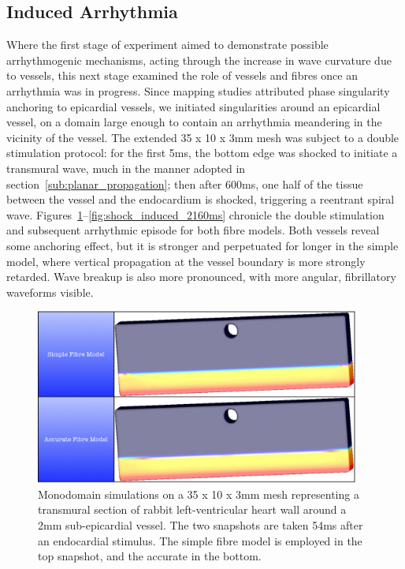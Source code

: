   \subsection{Induced Arrhythmia} %
  \label{sub:induced_arrhythmia}
    Where the first stage of experiment aimed to demonstrate possible arrhythmogenic mechanisms, acting through the increase in wave curvature due to vessels, this next stage examined the role of vessels and fibres once an arrhythmia was in progress. Since mapping studies \cite{Valderrabano2003,Cysyk2008,Qin2005} attributed phase singularity anchoring to epicardial vessels, we initiated singularities around an epicardial vessel, on a domain large enough to contain an arrhythmia meandering in the vicinity of the vessel. The extended 35 x 10 x 3mm mesh was subject to a double stimulation protocol: for the first 5ms, the bottom edge was shocked to initiate a transmural wave, much in the manner adopted in section~\ref{sub:planar_propagation}; then after 600ms, one half of the tissue between the vessel and the endocardium is shocked, triggering a reentrant spiral wave. Figures~\ref{fig:shock_induced_54ms}--\ref{fig:shock_induced_2160ms} chronicle the double stimulation and subsequent arrhythmic episode for both fibre models. Both vessels reveal some anchoring effect, but it is stronger and perpetuated for longer in the simple model, where vertical propagation at the vessel boundary is more strongly retarded. Wave breakup is also more pronounced, with more angular, fibrillatory waveforms visible.
  	
    \begin{figure}[htbp]
  		\centering
  	    \includegraphics[width=0.95\textwidth]{Ch4/Figs/shock_induced_54ms}
              \caption{Monodomain simulations on a 35 x 10 x 3mm mesh representing a transmural section of rabbit left-ventricular heart wall around a 2mm sub-epicardial vessel. The two snapshots are taken 54ms after an endocardial stimulus. The simple fibre model is employed in the top snapshot, and the accurate in the bottom.}
  	  \label{fig:shock_induced_54ms}
  	\end{figure}
  	
